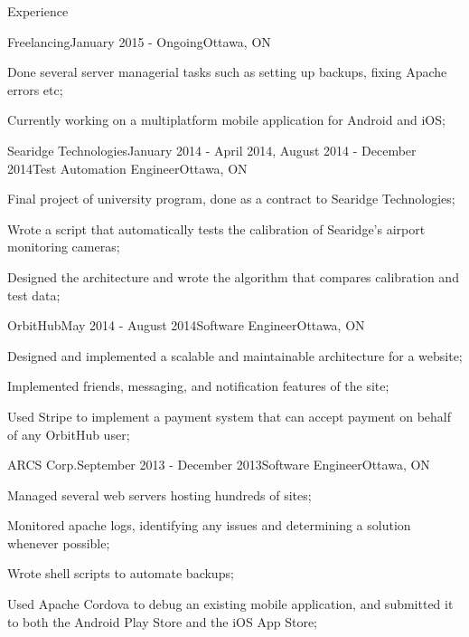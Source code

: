 \documentclass{resume} %
\begin{document}
\begin{rSection}{Experience}

\begin{rSubsection}{Freelancing}{January 2015 - Ongoing}{}{Ottawa, ON}
\item Done several server managerial tasks such as setting up backups, fixing Apache errors etc;
\item Currently working on a multiplatform mobile application for Android and iOS;
\end{rSubsection}

\begin{rSubsection}{Searidge Technologies}{January 2014 - April 2014, August 2014 - December 2014}{Test Automation Engineer}{Ottawa, ON}
\item Final project of university program, done as a contract to Searidge Technologies;
\item Wrote a script that automatically tests the calibration of Searidge's airport monitoring cameras;
\item Designed the architecture and wrote the algorithm that compares calibration and test data;
\end{rSubsection}

\begin{rSubsection}{OrbitHub}{May 2014 - August 2014}{Software Engineer}{Ottawa, ON}
\item Designed and implemented a scalable and maintainable architecture for a website;
\item Implemented friends, messaging, and notification features of the site;
\item Used Stripe to implement a payment system that can accept payment on behalf of any OrbitHub user;
\end{rSubsection}


\begin{rSubsection}{ARCS Corp.}{September 2013 - December 2013}{Software Engineer}{Ottawa, ON}
\item Managed several web servers hosting hundreds of sites;
\item Monitored apache logs, identifying any issues and determining a solution whenever possible;
\item Wrote shell scripts to automate backups;
\item Used Apache Cordova to debug an existing mobile application, and submitted it to both the Android Play Store and the iOS App Store;
\end{rSubsection}


\end{rSection}
\end{document}
